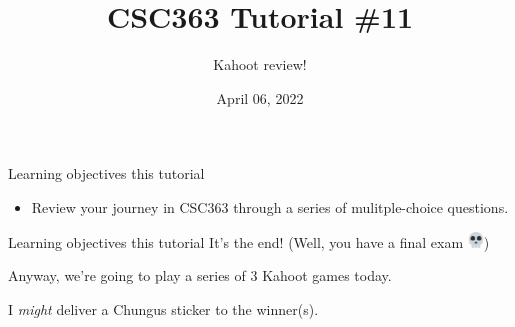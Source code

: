 \documentclass{beamer}
\title{CSC363 Tutorial \#11}
\subtitle{Kahoot review!}
\date{April 06, 2022}
\institute{}
\newcommand{\emojiskull}{\includegraphics[width=12pt]{img/skull.png}}
\begin{document}
\maketitle

\begin{frame}{Learning objectives this tutorial}
\begin{itemize}
\item Review your journey in CSC363 through a series of mulitple-choice questions.
\end{itemize}
\end{frame}

\begin{frame}{Learning objectives this tutorial}
It's the end! \pause (Well, you have a final exam \emojiskull) 

\vspace{2mm} \pause 

Anyway, we're going to play a series of 3 Kahoot games today. 

I \textit{might} deliver a Chungus sticker to the winner(s).
\end{frame}
\end{document}
